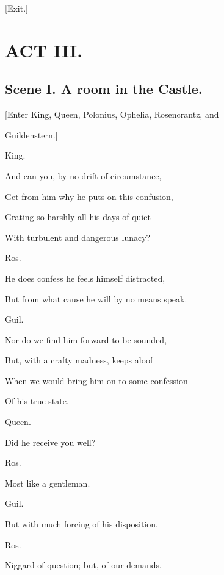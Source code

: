 \documentclass[12pt]{book}
\begin{document}
[Exit.]









\chapter*{ACT III.}



\section*{Scene I. A room in the Castle.}



[Enter King, Queen, Polonius, Ophelia, Rosencrantz, and

Guildenstern.]



King.

And can you, by no drift of circumstance,

Get from him why he puts on this confusion,

Grating so harshly all his days of quiet

With turbulent and dangerous lunacy?



Ros.

He does confess he feels himself distracted,

But from what cause he will by no means speak.



Guil.

Nor do we find him forward to be sounded,

But, with a crafty madness, keeps aloof

When we would bring him on to some confession

Of his true state.



Queen.

Did he receive you well?



Ros.

Most like a gentleman.



Guil.

But with much forcing of his disposition.



Ros.

Niggard of question; but, of our demands,
\end{document}
